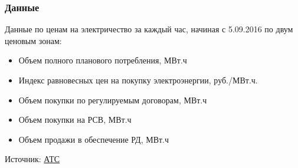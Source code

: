 \documentclass[c, dvipsnames]{beamer}  %
\begin{document}
\begin{frame}[shrink=5]
\frametitle{Данные} 


Данные по ценам на электричество за каждый час, начиная с 5.09.2016 по двум ценовым зонам: 

\begin{itemize}
	\item Объем полного планового потребления, МВт.ч
	\item Индекс равновесных цен на покупку электроэнергии, руб./МВт.ч.
	\item Объем покупки по регулируемым договорам, МВт.ч
	\item  Объем покупки на РСВ, МВт.ч	
	\item Объем продажи в обеспечение РД, МВт.ч	
%	
	
\end{itemize}

Источник: \href{https://www.atsenergo.ru/results/rsv}{АТС}




%
%
%
%
%


\end{frame}
\end{document}
